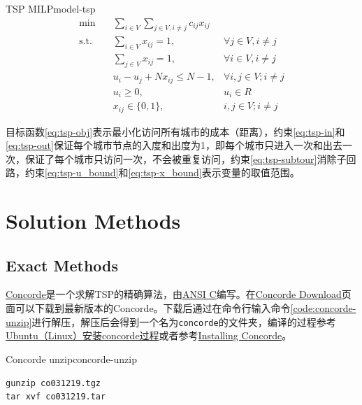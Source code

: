 \begin{model}{TSP MILP}{model-tsp}
\begin{align}
    \min \quad & \sum_{i \in V}\sum_{j \in V, i \neq j} c_{ij}x_{ij} & \label{eq:tsp-obj}\\
    \text{s.t.} \quad & \sum_{i \in V} x_{ij} = 1, & \forall j \in V, i \neq j\label{eq:tsp-in}\\
    \quad & \sum_{j \in V} x_{ij} = 1, & \forall i \in V, i \neq j \label{eq:tsp-out}\\
    \quad & u_i - u_j + Nx_{ij} \leq N - 1, & \forall i, j \in V; i \neq j \label{eq:tsp-subtour}\\
    \quad & u_i \geq 0, & u_i \in R \label{eq:tsp-u_bound}\\
    \quad & x_{ij} \in \{0, 1\}, & i, j \in V; i \neq j\label{eq:tsp-x_bound}
\end{align}
\end{model}

目标函数\ref{eq:tsp-obj}表示最小化访问所有城市的成本（距离），约束\ref{eq:tsp-in}和\ref{eq:tsp-out}保证每个城市节点的入度和出度为1，即每个城市只进入一次和出去一次，保证了每个城市只访问一次，不会被重复访问，约束\ref{eq:tsp-subtour}消除子回路，约束\ref{eq:tsp-u_bound}和\ref{eq:tsp-x_bound}表示变量的取值范围。

\section{Solution Methods}

\subsection{Exact Methods}
\href{https://www.math.uwaterloo.ca/tsp/concorde/index.html}{Concorde}是一个求解TSP的精确算法，由\href{https://www.wikiwand.com/en/articles/ANSI_C}{ANSI C}编写。在\href{https://www.math.uwaterloo.ca/tsp/concorde/downloads/downloads.htm}{Concorde Download}页面可以下载到最新版本的Concorde。下载后通过在命令行输入命令\ref{code:concorde-unzip}进行解压，解压后会得到一个名为\texttt{concorde}的文件夹，编译的过程参考\href{https://www.freesion.com/article/5581560004/}{Ubuntu（Linux）安装concorde过程}或者参考\href{https://github.com/perrygeo/pytsp/wiki/Installing-Solvers}{Installing Concorde}。

\begin{code}{Concorde unzip}{concorde-unzip}
\begin{verbatim}
gunzip co031219.tgz
tar xvf co031219.tar
\end{verbatim}
\end{code}

